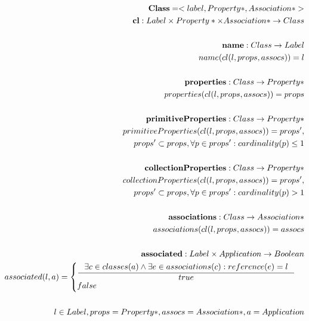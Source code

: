 \documentclass[11pt]{article}
\begin{document}
\begin{align*}
	\mathbf{Class} = <label, Property*, Association*> \\
	\mathbf{cl} : Label \times Property* \times Association* \rightarrow Class \\\\
	\mathbf{name} : Class \rightarrow Label \\
	name(cl(l, props, assocs)) = l \\ \\
	\mathbf{properties} : Class \rightarrow Property* \\
	properties(cl(l, props, assocs)) = props \\ \\
	\mathbf{primitiveProperties} : Class \rightarrow Property* \\	primitiveProperties(cl(l, props, assocs)) = props', \\ props' \subset props,  \forall p \in props' : cardinality(p) \leq 1 \\ \\
	\mathbf{collectionProperties} : Class \rightarrow Property* \\	collectionProperties(cl(l, props, assocs)) = props', \\ props' \subset props, \forall p \in props' : cardinality(p) > 1 \\ \\
	\mathbf{associations} : Class \rightarrow Association* \\	associations(cl(l, props, assocs)) = assocs \\ \\
	\mathbf{associated} :  Label \times Application \rightarrow Boolean \\
  	associated(l,a) = \begin{cases}
  		\inference{\exists c \in classes(a) \wedge \exists e \in associations(c) : reference(e) = l
  	}{ true } \\
 		false
 	\end{cases} \\ \\
	l \in Label, props = Property*, assocs = Association*, a = Application
\end{align*}
	 
\end{document}
